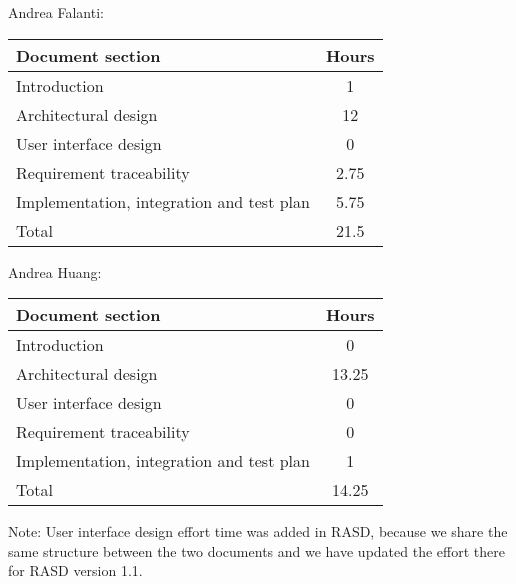 Andrea Falanti:

\begin{tabular}{|l|c|}
    \hline
    Document section & Hours \\
    \hline
     Introduction & 1\\
     Architectural design & 12\\
     User interface design & 0\\
     Requirement traceability & 2.75\\
     Implementation, integration and test plan & 5.75\\
     \hline
     Total & 21.5\\
     \hline
\end{tabular}
\vskip 0.3in

Andrea Huang:

\begin{tabular}{|l|c|}
    \hline
    Document section & Hours \\
    \hline
     Introduction & 0\\
     Architectural design & 13.25\\
     User interface design & 0\\
     Requirement traceability & 0\\
     Implementation, integration and test plan & 1\\
     \hline
     Total & 14.25\\
     \hline
\end{tabular}

\bigskip
\bigskip
Note: User interface design effort time was added in RASD, because we share the same structure between the two documents and we have updated the effort there for RASD version 1.1. 
